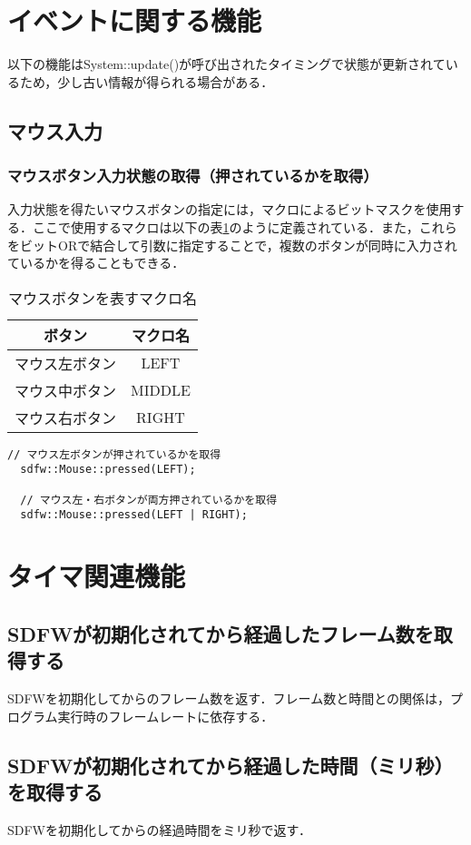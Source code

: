 \documentclass[a4paper, 11pt, oneside, onecolumn, openany]{jsarticle}
\begin{document}
\section{イベントに関する機能}
以下の機能はSystem::update()が呼び出されたタイミングで状態が更新されているため，少し古い情報が得られる場合がある．
\subsection{マウス入力}
\subsubsection{マウスボタン入力状態の取得（押されているかを取得）}
入力状態を得たいマウスボタンの指定には，マクロによるビットマスクを使用する．ここで使用するマクロは以下の表\ref{macro-MouseButton}のように定義されている．また，これらをビットORで結合して引数に指定することで，複数のボタンが同時に入力されているかを得ることもできる．
\begin{table}[H]
  \caption{マウスボタンを表すマクロ名}
  \label{macro-MouseButton}
  \centering
  \begin{tabular}{cc}
    \hline
    ボタン & マクロ名 \\
    \hline \hline
    マウス左ボタン & LEFT \\
    マウス中ボタン & MIDDLE \\
    マウス右ボタン & RIGHT \\
    \hline
  \end{tabular}
\end{table}

\begin{lstlisting}[caption=使用例, label=macro-GetMouseButtonState, keepspaces=true]
  // マウス左ボタンが押されているかを取得
  sdfw::Mouse::pressed(LEFT);

  // マウス左・右ボタンが両方押されているかを取得
  sdfw::Mouse::pressed(LEFT | RIGHT);
\end{lstlisting}


\section{タイマ関連機能}
\subsection{SDFWが初期化されてから経過したフレーム数を取得する}
SDFWを初期化してからのフレーム数を返す．フレーム数と時間との関係は，プログラム実行時のフレームレートに依存する．

\subsection{SDFWが初期化されてから経過した時間（ミリ秒）を取得する}
SDFWを初期化してからの経過時間をミリ秒で返す．
\end{document}
